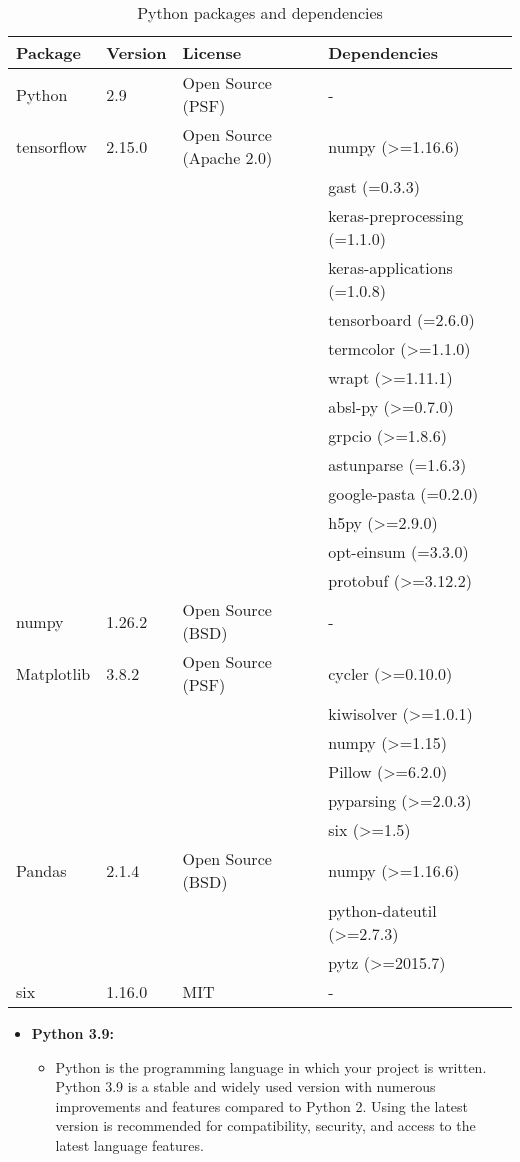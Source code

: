 \begin{enumerate}
	\begin{table}[H]
		\centering
		\begin{tabular}{||m{2cm}|m{1.5cm}|m{3.5cm}|m{3.5cm}|m||}
			\hline
			\textbf{Package} & \textbf{Version} & \textbf{License} & \textbf{Dependencies} \\
			\hline
			Python & 2.9 & Open Source (PSF) & - \\
			\hline
			tensorflow & 2.15.0 & Open Source (Apache 2.0) & numpy (>=1.16.6) \\
			& & & gast (=0.3.3) \\
			& & & keras-preprocessing (=1.1.0) \\
			& & & keras-applications (=1.0.8) \\
			& & & tensorboard (=2.6.0) \\
			& & & termcolor (>=1.1.0) \\
			& & & wrapt (>=1.11.1) \\
			& & & absl-py (>=0.7.0) \\
			& & & grpcio (>=1.8.6) \\
			& & & astunparse (=1.6.3) \\
			& & & google-pasta (=0.2.0) \\
			& & & h5py (>=2.9.0) \\
			& & & opt-einsum (=3.3.0) \\
			& & & protobuf (>=3.12.2) \\
			\hline
			numpy & 1.26.2 & Open Source (BSD) & - \\
			\hline
			Matplotlib & 3.8.2 & Open Source (PSF) & cycler (>=0.10.0) \\
			& & & kiwisolver (>=1.0.1) \\
			& & & numpy (>=1.15) \\
			& & & Pillow (>=6.2.0) \\
			& & & pyparsing (>=2.0.3) \\
			& & & six (>=1.5) \\
			\hline
			Pandas & 2.1.4 & Open Source (BSD) & numpy (>=1.16.6) \\
			& & & python-dateutil (>=2.7.3) \\
			& & & pytz (>=2015.7) \\
			\hline
			six & 1.16.0 & MIT & - \\
			\hline
		\end{tabular}
		\caption{Python packages and dependencies}
		\label{Tab:PythonPackages}
	\end{table}
	
	\begin{itemize}
		\item \textbf{Python 3.9:}
		\begin{itemize}
			\item Python is the programming language in which your project is written. Python 3.9 is a stable and widely used version with numerous improvements and features compared to Python 2. Using the latest version is recommended for compatibility, security, and access to the latest language features.
		\end{itemize}
		

\end{itemize}
\end{enumerate}
